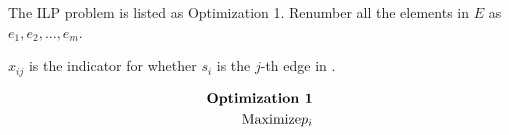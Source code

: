 \documentclass[letterpaper]{article}
\begin{document}
The ILP problem is listed as Optimization 1.
Renumber all the elements in $E$ as $e_1,e_2,\ldots,e_m$.

 $x_{ij}$ is the indicator for whether $s_i$ is the $j$-th edge in .

\begin{equation}
	\begin{aligned}
	\text{\textbf{Optimization 1}}\\
	\text{Maximize}p_i
	\end{aligned}
\end{equation}



\newpage


\end{document}

